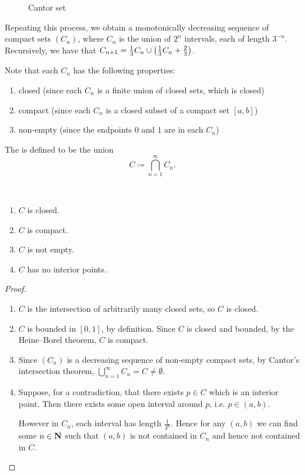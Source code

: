 \begin{figure}[H]
\centering
{}
\caption{Cantor set}
\end{figure}

Repeating this process, we obtain a monotonically decreasing sequence of compact sets $(C_n)$, where $C_n$ is the union of $2^n$ intervals, each of length $3^{-n}$. Recursively, we have that $C_{n+1}=\frac{1}{3}C_n\cup\left(\frac{1}{3}C_n+\frac{2}{3}\right)$.

Note that each $C_n$ has the following properties:
\begin{enumerate}[label=(\roman*)]
\item closed (since each $C_n$ is a finite union of closed sets, which is closed)
\item compact (since each $C_n$ is a closed subset of a compact set $[a,b]$)
\item non-empty (since the endpoints $0$ and $1$ are in each $C_n$)
\end{enumerate}

The  is defined to be the union
\[C\coloneqq\bigcap_{n=1}^{\infty}C_n.\]

\begin{lemma} \
\begin{enumerate}[label=(\roman*)]
\item $C$ is closed.
\item $C$ is compact.
\item $C$ is not empty.
\item $C$ has no interior points.
\end{enumerate}
\end{lemma}

\begin{proof} \
\begin{enumerate}[label=(\roman*)]
\item $C$ is the intersection of arbitrarily many closed sets, so $C$ is closed.
\item $C$ is bounded in $[0,1]$, by definition. Since $C$ is closed and bounded, by the Heine--Borel theorem, $C$ is compact.
\item Since $(C_n)$ is a decreasing sequence of non-empty compact sets, by Cantor's intersection theorem, $\bigcup_{n=1}^{\infty}C_n=C\neq\emptyset$.
\item Suppose, for a contradiction, that there exists $p\in C$ which is an interior point. Then there exists some open interval around $p$, i.e. $p\in(a,b)$.

However in $C_n$, each interval has length $\frac{1}{3^n}$. Hence for any $(a,b)$ we can find some $n\in\mathbf N$ such that $(a,b)$ is not contained in $C_n$ and hence not contained in $C$.
\end{enumerate}
\end{proof}

